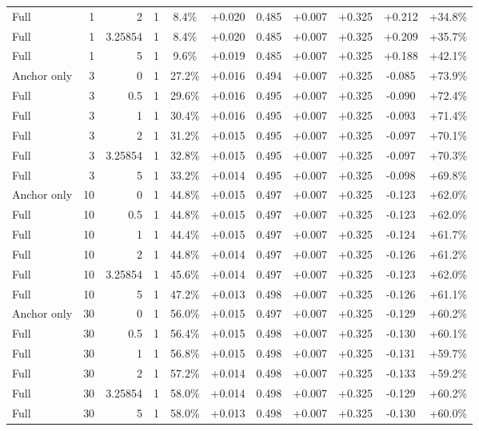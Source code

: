 \begin{table}[htbp]
\begin{tabular}{lrrrccccccc}
Full & 1 & 2 & 1 & 8.4\% & +0.020 & 0.485 & +0.007 & +0.325 & +0.212 & +34.8\% \\
Full & 1 & 3.25854 & 1 & 8.4\% & +0.020 & 0.485 & +0.007 & +0.325 & +0.209 & +35.7\% \\
Full & 1 & 5 & 1 & 9.6\% & +0.019 & 0.485 & +0.007 & +0.325 & +0.188 & +42.1\% \\
Anchor only & 3 & 0 & 1 & 27.2\% & +0.016 & 0.494 & +0.007 & +0.325 & -0.085 & +73.9\% \\
Full & 3 & 0.5 & 1 & 29.6\% & +0.016 & 0.495 & +0.007 & +0.325 & -0.090 & +72.4\% \\
Full & 3 & 1 & 1 & 30.4\% & +0.016 & 0.495 & +0.007 & +0.325 & -0.093 & +71.4\% \\
Full & 3 & 2 & 1 & 31.2\% & +0.015 & 0.495 & +0.007 & +0.325 & -0.097 & +70.1\% \\
Full & 3 & 3.25854 & 1 & 32.8\% & +0.015 & 0.495 & +0.007 & +0.325 & -0.097 & +70.3\% \\
Full & 3 & 5 & 1 & 33.2\% & +0.014 & 0.495 & +0.007 & +0.325 & -0.098 & +69.8\% \\
Anchor only & 10 & 0 & 1 & 44.8\% & +0.015 & 0.497 & +0.007 & +0.325 & -0.123 & +62.0\% \\
Full & 10 & 0.5 & 1 & 44.8\% & +0.015 & 0.497 & +0.007 & +0.325 & -0.123 & +62.0\% \\
Full & 10 & 1 & 1 & 44.4\% & +0.015 & 0.497 & +0.007 & +0.325 & -0.124 & +61.7\% \\
Full & 10 & 2 & 1 & 44.8\% & +0.014 & 0.497 & +0.007 & +0.325 & -0.126 & +61.2\% \\
Full & 10 & 3.25854 & 1 & 45.6\% & +0.014 & 0.497 & +0.007 & +0.325 & -0.123 & +62.0\% \\
Full & 10 & 5 & 1 & 47.2\% & +0.013 & 0.498 & +0.007 & +0.325 & -0.126 & +61.1\% \\
Anchor only & 30 & 0 & 1 & 56.0\% & +0.015 & 0.497 & +0.007 & +0.325 & -0.129 & +60.2\% \\
Full & 30 & 0.5 & 1 & 56.4\% & +0.015 & 0.498 & +0.007 & +0.325 & -0.130 & +60.1\% \\
Full & 30 & 1 & 1 & 56.8\% & +0.015 & 0.498 & +0.007 & +0.325 & -0.131 & +59.7\% \\
Full & 30 & 2 & 1 & 57.2\% & +0.014 & 0.498 & +0.007 & +0.325 & -0.133 & +59.2\% \\
Full & 30 & 3.25854 & 1 & 58.0\% & +0.014 & 0.498 & +0.007 & +0.325 & -0.129 & +60.2\% \\
Full & 30 & 5 & 1 & 58.0\% & +0.013 & 0.498 & +0.007 & +0.325 & -0.130 & +60.0\% \\

\end{tabular}
\end{table}
